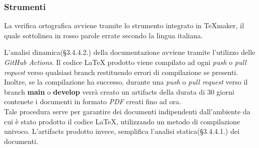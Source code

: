 \subsubsection{Strumenti}

La verifica ortografica avviene tramite lo strumento integrato in \TeX maker, il quale sottolinea in rosso parole errate secondo la lingua italiana.

L'analisi dinamica(§3.4.4.2.) della documentazione avviene tramite l'utilizzo delle \textit{GitHub Actions}. Il codice \LaTeX{} prodotto viene compilato ad ogni \textit{push} o \textit{pull request} verso qualsiasi branch restituendo errori di compilazione se presenti. Inoltre, se la compilazione ha successo, durante una \textit{push} o \textit{pull request} verso il branch \textbf{main} o \textbf{develop} verrà creato un artifacts della durata di 30 giorni contenete i documenti in formato \textit{PDF} creati fino ad ora.\\
Tale procedura serve per garantire dei documenti indipendenti dall'ambiente da cui è stato prodotto il codice \LaTeX, utilizzando un metodo di compilazione univoco. L'artifacts prodotto invece, semplifica l'analisi statica(§3.4.4.1.) dei documenti.